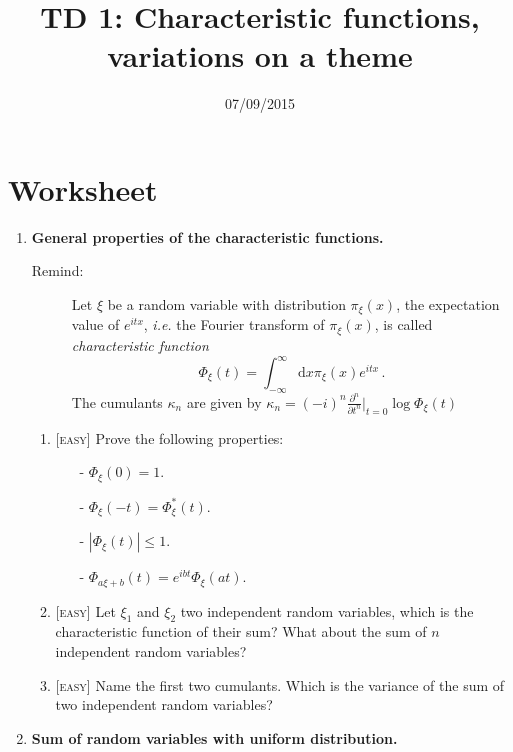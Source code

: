 \documentclass{article}
\newcommand{\be}{\begin{equation}}
\newcommand{\ee}{\end{equation}}
\newcommand{\1}{{\rm I}}
\begin{document}
\title{TD 1: Characteristic functions, variations on a theme}
\date{07/09/2015}
\maketitle
\section{Worksheet }
\begin{enumerate}
\item \textbf{General properties of the characteristic functions.} 
\begin{description}
\item[Remind:] Let $\xi$ be a random variable with distribution $\pi_\xi(x)$, the expectation value of $e^{i t x}$, \emph{i.e.} the Fourier transform of $\pi_\xi(x)$,  is called \emph{characteristic function}
\be
\Phi_\xi(t)=\int_{-\infty}^\infty\mathrm d x  \pi_\xi(x)e^{i t x}\, .
\ee
The cumulants $\kappa_n$ are given by $\kappa_n=(-i)^n\frac{\partial^n}{\partial t^n}\Bigr|_{t=0}\log \Phi_\xi (t)$
\end{description}
\begin{enumerate}
\item  \textsc{[easy]}  Prove the following properties:
\begin{itemize}
\item[-] $\Phi_\xi(0)=1$.
\item[-] $\Phi_\xi(-t)=\Phi_\xi^*(t)$. 
\item[-] $|\Phi_\xi(t)|\leq 1$. 
\item[-] $\Phi_{a\xi+b}(t)=e^{i b t}\Phi_{\xi}(a t)$.
\end{itemize}
\item  \textsc{[easy]}  Let $\xi_1$ and $\xi_2$ two independent random variables, which is the characteristic function of their sum? What about the sum of $n$ independent random variables? 
\item \textsc{[easy]} Name the first two cumulants. Which is the variance of the sum of two independent random variables?
\end{enumerate}
\item \textbf{Sum of random variables with uniform distribution.}
\end{enumerate}
\end{document}

